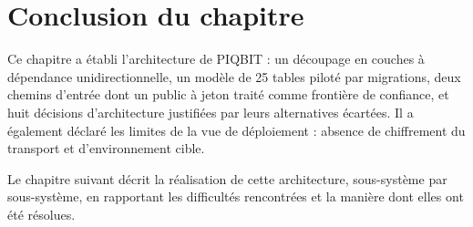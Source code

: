 \section{Conclusion du chapitre}
\label{sec:arch_conclusion}

Ce chapitre a établi l'architecture de PIQBIT : un découpage en couches à
dépendance unidirectionnelle, un modèle de 25 tables piloté par migrations,
deux chemins d'entrée dont un public à jeton traité comme frontière de
confiance, et huit décisions d'architecture justifiées par leurs alternatives
écartées. Il a également déclaré les limites de la vue de déploiement :
absence de chiffrement du transport et d'environnement cible.

Le chapitre suivant décrit la réalisation de cette architecture, sous-système
par sous-système, en rapportant les difficultés rencontrées et la manière dont
elles ont été résolues.
